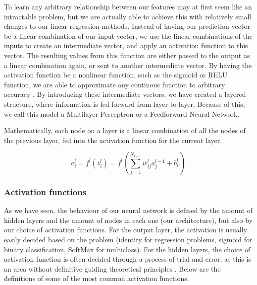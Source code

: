 \documentclass[onecolumn,10pt,cleanfoot]{asme2ej}
\begin{document}
To learn any arbitrary relationship between our features may at first seem like an intractable problem, but we are actually able to achieve this with relatively small changes to our linear regression methods. Instead of having our prediction vector be a linear combination of our input vector, we use the linear combinations of the inputs to create an intermediate vector, and apply an activation function to this vector. The resulting values from this function are either passed to the output as a linear combination again, or sent to another intermediate vector. By having the activation function be a nonlinear function, such as the sigmoid or RELU function, we are able to approximate any continous function to arbitrary accuracy \cite[230]{cmb}. By introducing these intermediate vectors, we have created a layered structure, where information is fed forward from layer to layer. Because of this, we call this model a Multilayer Perceptron or a Feedforward Neural Network.

Mathematically, each node on a layer is a linear combination of all the nodes of the previous layer, fed into the activation function for the current layer.

\begin{equation}
a_i^l = f^l(z_i^l) = f^l\left(\sum_{j=1}^{N_{l-1}} w_{ij}^l a_j^{l-1} + b_i^l\right).
\end{equation}

%
%

\subsubsection{Activation functions}

As we have seen, the behaviour of our neural network is defined by the amount of hidden layers and the amount of nodes in each one (our architecture), but also by our choice of activation functions. For the output layer, the activation is usually easily decided based on the problem (identity for regression problems, sigmoid for binary classification, SoftMax for multiclass). For the hidden layers, the choice of activation function is often decided through a process of trial and error, as this is an area without definitive guiding theoretical principles \cite[188]{gbc}. Below are the definitions of some of the most common activation functions.
\end{document}
